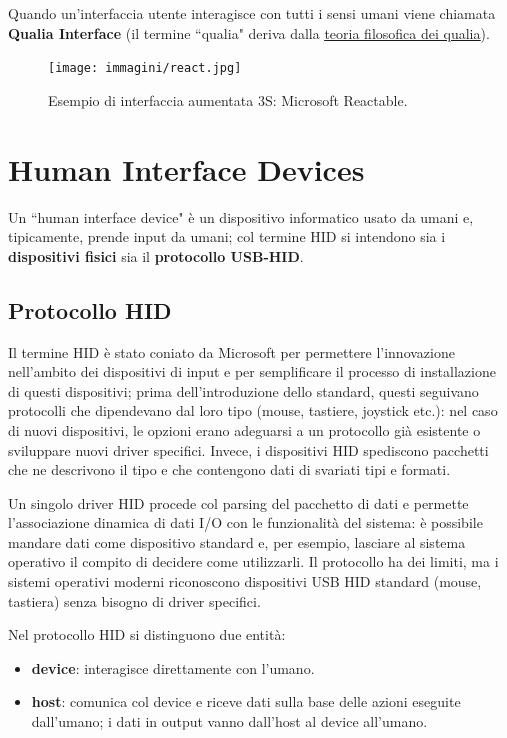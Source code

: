 Quando un'interfaccia utente interagisce con tutti i sensi umani viene chiamata \textbf{Qualia Interface} (il termine ``qualia" deriva
dalla \href{https://it.wikipedia.org/wiki/Qualia}{\underline{teoria filosofica dei qualia}}).

\begin{figure}[!h]
	\centering
	\texttt{[image: immagini/react.jpg]}
	\caption{Esempio di interfaccia aumentata 3S: Microsoft Reactable.}
\end{figure}

\section{Human Interface Devices}

Un ``human interface device" è un dispositivo informatico usato da umani e, tipicamente, prende input da umani; col termine HID si intendono sia i
\textbf{dispositivi fisici} sia il \textbf{protocollo USB-HID}.

\subsection*{Protocollo HID}

Il termine HID è stato coniato da Microsoft per permettere l'innovazione nell'ambito dei dispositivi di input e per semplificare il processo di
installazione di questi dispositivi; prima dell'introduzione dello standard, questi seguivano protocolli che dipendevano dal loro tipo
(mouse, tastiere, joystick etc.): nel caso di nuovi dispositivi, le opzioni erano adeguarsi a un protocollo già esistente o sviluppare
nuovi driver specifici. Invece, i dispositivi HID spediscono pacchetti che ne descrivono il tipo e che contengono dati di svariati tipi e formati.

Un singolo driver HID procede col parsing del pacchetto di dati e permette l'associazione dinamica di dati I/O con le funzionalità del sistema: è
possibile mandare dati come dispositivo standard e, per esempio, lasciare al sistema operativo il compito di decidere come utilizzarli. Il protocollo
ha dei limiti, ma i sistemi operativi moderni riconoscono dispositivi USB HID standard (mouse, tastiera) senza bisogno di driver specifici.

Nel protocollo HID si distinguono due entità:
\begin{itemize}
	\itemsep-0.3em
	\item \textbf{device}: interagisce direttamente con l'umano.
	\item \textbf{host}: comunica col device e riceve dati sulla base delle azioni eseguite dall'umano; i dati in output vanno dall'host al
	device all'umano.
\end{itemize}

